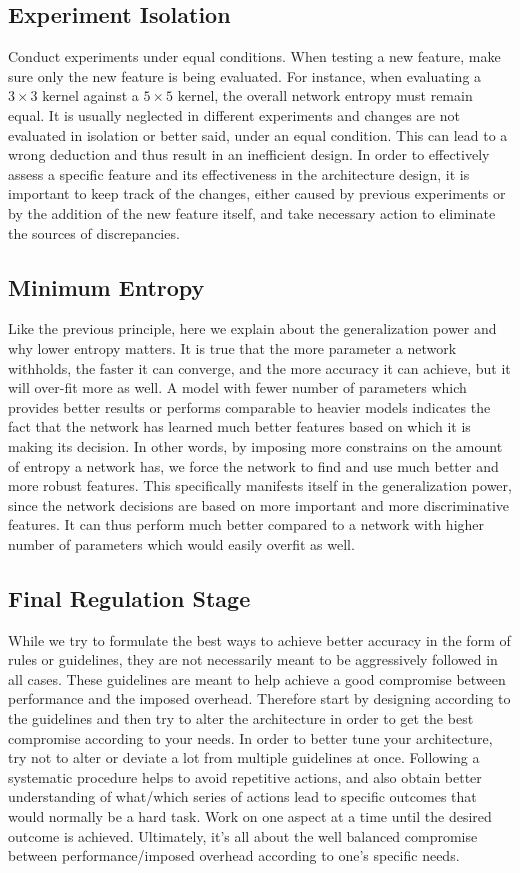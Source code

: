 \documentclass{article} \usepackage{lets_keepit_simple,times}
\begin{document}
\subsection{Experiment Isolation}
Conduct experiments under equal conditions. When testing a new feature, make sure only the new feature is being evaluated. For instance, when evaluating a $3 \times 3$ kernel against a $5 \times 5$ kernel, the overall network entropy must remain equal. It is usually neglected in different experiments and changes are not evaluated in isolation or better said, under an equal condition. This can lead to a wrong deduction and thus result in an inefficient design. In order to effectively assess a specific feature and its effectiveness in the architecture design, it is important to keep track of the changes, either caused by previous experiments or by the addition of the new feature itself, and take necessary action to eliminate the sources of discrepancies. 
\subsection{Minimum Entropy}
Like the previous principle, here we explain about the generalization power and why lower entropy matters. It is true that the more parameter a network withholds, the faster it can converge, and the more accuracy it can achieve, but it will over-fit more as well. A model with fewer number of parameters which provides better results or performs comparable to heavier models indicates the fact that the network has learned much better features based on which it is making its decision. In other words, by imposing more constrains on the amount of entropy a network has, we force the network to find and use much better and more robust features. This specifically manifests itself in the generalization power, since the network decisions are based on more important and more discriminative features. It can thus perform much better compared to a network with higher number of parameters which would easily overfit as well.    
\subsection{Final Regulation Stage}
While we try to formulate the best ways to achieve better accuracy in the form of rules or guidelines, they are not necessarily meant to be aggressively followed in all cases. These guidelines are meant to help achieve a good compromise between performance and the imposed overhead. Therefore start by designing according to the guidelines and then try to alter the architecture in order to get the best compromise according to your needs. In order to better tune your architecture, try not to alter or deviate a lot from multiple guidelines at once. Following a systematic procedure helps to avoid repetitive actions, and also obtain better understanding of what/which series of actions lead to specific outcomes that would normally be a hard task. Work on one aspect at a time until the desired outcome is achieved. Ultimately, it's all about the well balanced compromise between performance/imposed overhead according to one's specific needs.\\
\end{document}
